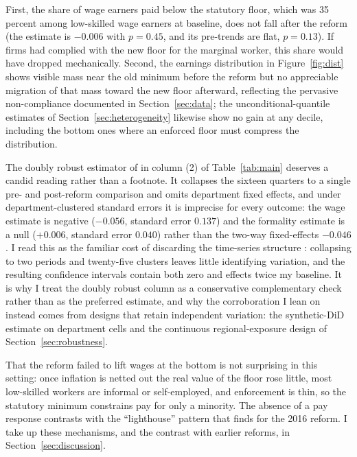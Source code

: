 First, the share of wage earners paid below the statutory floor, which was 35 percent among low-skilled wage earners at baseline, does not fall after the reform (the estimate is $-0.006$ with $p=0.45$, and its pre-trends are flat, $p=0.13$). If firms had complied with the new floor for the marginal worker, this share would have dropped mechanically. Second, the earnings distribution in Figure~\ref{fig:dist} shows visible mass near the old minimum before the reform but no appreciable migration of that mass toward the new floor afterward, reflecting the pervasive non-compliance documented in Section~\ref{sec:data}; the unconditional-quantile estimates of Section~\ref{sec:heterogeneity} likewise show no gain at any decile, including the bottom ones where an enforced floor must compress the distribution.

The doubly robust estimator of \citet{santanna_zhao_2020} in column (2) of Table~\ref{tab:main} deserves a candid reading rather than a footnote. It collapses the sixteen quarters to a single pre- and post-reform comparison and omits department fixed effects, and under department-clustered standard errors it is imprecise for every outcome: the wage estimate is negative ($-0.056$, standard error $0.137$) and the formality estimate is a null ($+0.006$, standard error $0.040$) rather than the two-way fixed-effects $-0.046$. I read this as the familiar cost of discarding the time-series structure \citep{bertrand_2004}: collapsing to two periods and twenty-five clusters leaves little identifying variation, and the resulting confidence intervals contain both zero and effects twice my baseline. It is why I treat the doubly robust column as a conservative complementary check rather than as the preferred estimate, and why the corroboration I lean on instead comes from designs that retain independent variation: the synthetic-DiD estimate on department cells and the continuous regional-exposure design of Section~\ref{sec:robustness}.

That the reform failed to lift wages at the bottom is not surprising in this setting: once inflation is netted out the real value of the floor rose little, most low-skilled workers are informal or self-employed, and enforcement is thin, so the statutory minimum constrains pay for only a minority. The absence of a pay response contrasts with the ``lighthouse'' pattern that \citet{jimenez_2023} finds for the 2016 reform. I take up these mechanisms, and the contrast with earlier reforms, in Section~\ref{sec:discussion}.


